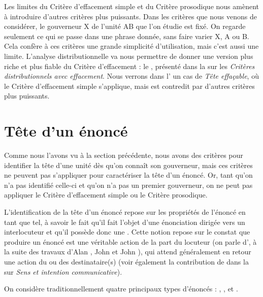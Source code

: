 \begin{sloppypar}
Les limites du Critère d’effacement simple et du Critère prosodique nous amènent à introduire d’autres critères plus puissants. Dans les critères que nous venons de considérer, le gouverneur X de l’unité AB que l’on étudie est fixé. On regarde seulement ce qui se passe dans une phrase donnée, sans faire varier X, A ou B. Cela confère à ces critères une grande simplicité d’utilisation, mais c’est aussi une limite. L’analyse distributionnelle va nous permettre de donner une version plus riche et plus fiable du Critère d’effacement : le , présenté dans la  sur les \textit{Critères distributionnels avec effacement}. Nous verrons dans l' un cas de \textit{Tête effaçable}, où le Critère d'effacement simple s'applique, mais est contredit par d'autres critères plus puissants.
\end{sloppypar}

\section{Tête d’un énoncé}\label{sec:3.3.8}

Comme nous l’avons vu à la section précédente, nous avons des critères pour identifier la tête d’une unité dès qu’on connaît son gouverneur, mais ces critères ne peuvent pas s’appliquer pour caractériser la tête d’un énoncé. Or, tant qu’on n’a pas identifié celle-ci et qu’on n’a pas un premier gouverneur, on ne peut pas appliquer le Critère d’effacement simple ou le Critère prosodique.

L’identification de la tête d’un énoncé repose sur les propriétés de l’énoncé en tant que tel, à savoir le fait qu’il fait l’objet d’une énonciation dirigée vers un interlocuteur et qu’il possède donc une . Cette notion repose sur le constat que produire un énoncé est une véritable action de la part du locuteur (on parle d’, à la suite des travaux d'Alan \citet{gardiner1932speech}, John \citet{austin1962how} et John \citet{searle1969speech}), qui attend généralement en retour une action du ou des destinataire(s) (voir également la contribution de \citet{bloomfield1933language} dans la  sur \textit{Sens et intention communicative}).

On considère traditionnellement quatre principaux types d’énoncés : , ,  et .

